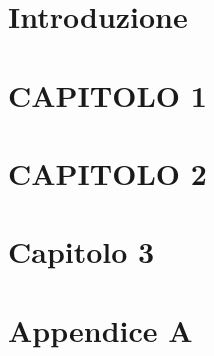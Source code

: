 \documentclass[14pt]{extreport}
\begin{document}
\setcounter{page}{1} 		
\newpage
\newpage
	

\tableofcontents
\listoffigures %




\chapter*{Introduzione}
\section*{}
\setcounter{page}{1} 		




\chapter{CAPITOLO 1}

\chapter{CAPITOLO 2}

\chapter{Capitolo 3}

\appendix
\chapter{Appendice A}


\end{document}
